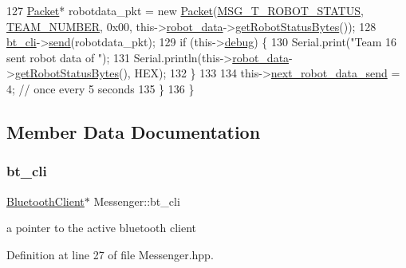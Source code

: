 \begin{DoxyCode}
127         \hyperlink{class_packet}{Packet}* robotdata\_pkt = \textcolor{keyword}{new} \hyperlink{class_packet}{Packet}(\hyperlink{config_8h_a0a932cd1586d37c8ecefd9ab90f52faf}{MSG\_T\_ROBOT\_STATUS}, 
      \hyperlink{config_8h_a9dd3063be5a2b2a9e053e58f7688b0db}{TEAM\_NUMBER}, 0x00, this->\hyperlink{class_messenger_aaeacb9e9c4aad3b1be628df9ec71c11c}{robot\_data}->\hyperlink{class_robot_data_a9e8a44387275e115f71713210c8b0841}{getRobotStatusBytes}());
128         \hyperlink{class_messenger_a481ed6f0554ddfb8441b7dc073f57ebd}{bt\_cli}->\hyperlink{class_bluetooth_client_a0f0d9b99f80c2eab9d9d33d8aca91bf6}{send}(robotdata\_pkt);
129         \textcolor{keywordflow}{if} (this->\hyperlink{class_messenger_a103d1964b9540a6b6b1c4ea7d79f3af3}{debug}) \{
130             Serial.print(\textcolor{stringliteral}{"Team 16 sent robot data of "});
131             Serial.println(this->\hyperlink{class_messenger_aaeacb9e9c4aad3b1be628df9ec71c11c}{robot\_data}->\hyperlink{class_robot_data_a9e8a44387275e115f71713210c8b0841}{getRobotStatusBytes}(), HEX);
132         \}
133 
134         this->\hyperlink{class_messenger_af47b5f9743fcef4fdb73801ae7c6b023}{next\_robot\_data\_send} = 4; \textcolor{comment}{// once every 5 seconds}
135     \}
136 \}
\end{DoxyCode}


\subsection{Member Data Documentation}
\mbox{\label{class_messenger_a481ed6f0554ddfb8441b7dc073f57ebd}} 
\subsubsection{\texorpdfstring{bt\+\_\+cli}{bt\_cli}}
{\footnotesize\ttfamily \hyperlink{class_bluetooth_client}{Bluetooth\+Client}$\ast$ Messenger\+::bt\+\_\+cli\hspace{0.3cm}{\ttfamily [private]}}



a pointer to the active bluetooth client 



Definition at line 27 of file Messenger.\+hpp.

\mbox{\label{class_messenger_a103d1964b9540a6b6b1c4ea7d79f3af3}} 
